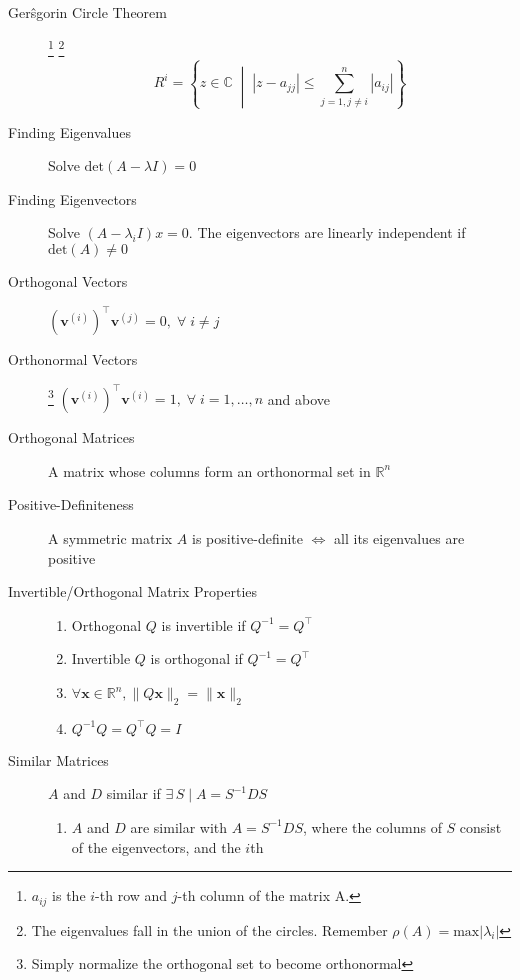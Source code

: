 \documentclass[8pt]{article}
\begin{document}

\begin{multicols}{2}
  \begin{description}
  \item[Ger\^{s}gorin Circle Theorem]
    \footnote{$a_{ij}$ is the $i$-th row and $j$-th column of the matrix A.}
    \footnote{The eigenvalues fall in the union of the circles. Remember $\rho(A)=\text{max}|\lambda_i|$}
    $$R^i=\left\{z\in\mathbb{C} \;\middle|\; |z-a_{jj}|\leq\sum_{j=1,j\neq i}^{n}|a_{ij}|\right\}$$
  \item[Finding Eigenvalues] Solve $\mathrm{det}(A-\lambda I)=0$
  \item[Finding Eigenvectors] Solve $(A-\lambda_iI)x=0$. The
    eigenvectors are linearly independent if $\mathrm{det}(A)\neq 0$
  \item[Orthogonal Vectors]
    $(\mathbf{v}^{(i)})^\top\mathbf{v}^{(j)}=0, \;\forall\; i\neq j$
  \item[Orthonormal Vectors]
    \footnote{Simply normalize the orthogonal set to become orthonormal}
    $(\mathbf{v}^{(i)})^\top\mathbf{v}^{(i)}=1, \;\forall\; i=1,\dots,n$ and above
  \item[Orthogonal Matrices]
    A matrix whose columns form an orthonormal set in $\mathbb{R}^n$
  \item[Positive-Definiteness] A symmetric matrix $A$ is
    positive-definite $\iff$ all its eigenvalues are positive
  \item[Invertible/Orthogonal Matrix Properties] \hfill
    \begin{enumerate}[i]
    \item Orthogonal $Q$ is invertible if $Q^{-1}=Q^\top$
    \item Invertible $Q$ is orthogonal if $Q^{-1}=Q^\top$
    \item $\forall\mathbf{x} \in \mathbb{R}^n,\|Q\mathbf{x}\|_2=\|\mathbf{x}\|_2$
    \item $Q^{-1}Q=Q^\top Q=I$
    \end{enumerate}
  \item[Similar Matrices] $A$ and $D$ similar if $\exists\,S\;|\;A=S^{-1}DS$
    \begin{enumerate}[i]
    \item $A$ and $D$ are similar with $A = S^{−1}DS$, where the
      columns of $S$ consist of the eigenvectors, and the $i$th

\end{enumerate}
\end{description}
\end{multicols}
\end{document}
